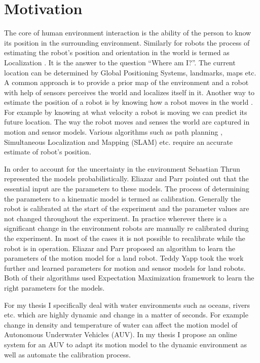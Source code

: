 \documentclass[12pt]{dalcsthesis}
\begin{document}
\section{Motivation}


The core of human environment interaction is the ability of the person to know its position in the surrounding environment. Similarly for robots the process of estimating the robot's position and orientation in the world is termed as Localization \cite{thrun2005probabilistic}. It is the answer to the question “Where am I?”. The current location can be determined by Global Positioning Systems, landmarks, maps etc. A common approach is to provide a prior map of the environment and a robot with help of sensors perceives the world and localizes itself in it. Another way to estimate the position of a robot is by knowing how a robot moves in the world . For example by knowing at what velocity a robot is moving we can predict its future location. The way the robot moves and senses the world are captured in motion and sensor models. Various algorithms such as path planning \cite{Lav06}, Simultaneous Localization and Mapping (SLAM) \cite{thrun2005probabilistic} \cite{grisettiyz2005improving}  etc. require an accurate estimate of robot's position.

In order to account for the uncertainty in the environment Sebastian Thrun \cite{thrun2005probabilistic} represented the models probabilistically. Eliazar and Parr \cite{Eliazar2004} pointed out that the essential input are the parameters to these models. The process of determining the parameters to a kinematic model is termed as calibration. Generally the robot is calibrated at the start of the experiment and the parameter values are not changed throughout the experiment. In practice wherever there is a significant change in the environment robots are manually re calibrated during the experiment. In most of the cases it is not possible to recalibrate while the robot is in operation. Eliazar and Parr \cite{Eliazar2004} proposed an algorithm to learn the parameters of the motion model for a land robot. Teddy Yapp \cite{Yap2008} took the work further and learned parameters for motion and sensor models for land robots. Both of their algorithms used Expectation Maximization framework to learn the right parameters for the models.

For my thesis I specifically deal with water environments such as oceans, rivers etc. which are highly dynamic and change in a matter of seconds. For example change in density and temperature of water can affect the motion model of Autonomous Underwater Vehicles (AUV). In my thesis I propose an online system for an AUV to adapt its motion model to the dynamic environment as well as automate the calibration process. 
\end{document}
